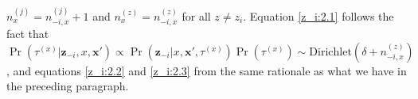 $n_x^{(j)} = n_{-i,x}^{(j)} + 1$ and $n_x^{(z)} = n_{-i,x}^{(z)}$ for all $z \ne
z_i$.   Equation \eqref{z_i:2.1} follows the fact that
$\Pr(\tau^{(x)}|\mathbf{z}_{-i}, x, \mathbf{x}') \propto \Pr(\mathbf{z}_{-i}|x,
\mathbf{x}', \tau^{(x)}) \Pr(\tau^{(x)}) \sim \mathrm{Dirichlet}(\delta +
n_{-i,x}^{(z)})$, and equations \eqref{z_i:2.2} and \eqref{z_i:2.3} from the
same rationale as what we have in the preceding paragraph.

